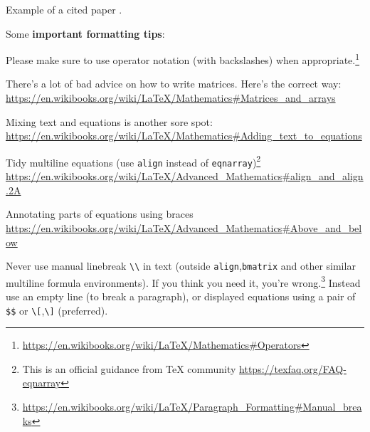 \documentclass{amsart}
\begin{document}
Example of a cited paper \cite{Hill1894}.

 Some \textbf{important formatting tips}:
\begin{compactitem}
\item Please make sure to use operator notation (with backslashes) when appropriate.\footnote{\url{https://en.wikibooks.org/wiki/LaTeX/Mathematics\#Operators}}
\item There's a lot of bad advice on how to write matrices. Here's the correct way: \url{https://en.wikibooks.org/wiki/LaTeX/Mathematics\#Matrices_and_arrays}
\item Mixing text and equations is another sore spot: \url{https://en.wikibooks.org/wiki/LaTeX/Mathematics\#Adding_text_to_equations}
\item Tidy multiline equations (use \verb|align| instead of \verb|eqnarray|)\footnote{This is an official guidance from TeX community \url{https://texfaq.org/FAQ-eqnarray}} \url{https://en.wikibooks.org/wiki/LaTeX/Advanced_Mathematics\#align_and_align.2A}
\item Annotating parts of equations using braces \url{https://en.wikibooks.org/wiki/LaTeX/Advanced_Mathematics\#Above_and_below}
\item Never use manual linebreak \verb|\\| in text (outside \verb|align|,\verb|bmatrix| and other similar multiline formula environments). If you think you need it, you're wrong.\footnote{\url{https://en.wikibooks.org/wiki/LaTeX/Paragraph_Formatting\#Manual_breaks}} Instead use an empty line (to break a paragraph), or displayed equations using a pair of \verb|$$| or \verb|\[|,\verb|\]| (preferred).
\end{compactitem}
\end{document}
